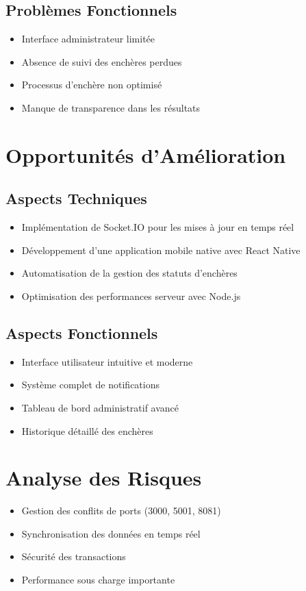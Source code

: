 \subsection{Problèmes Fonctionnels}
\begin{itemize}
    \item Interface administrateur limitée
    \item Absence de suivi des enchères perdues
    \item Processus d'enchère non optimisé
    \item Manque de transparence dans les résultats
\end{itemize}

\section{Opportunités d'Amélioration}
\subsection{Aspects Techniques}
\begin{itemize}
    \item Implémentation de Socket.IO pour les mises à jour en temps réel
    \item Développement d'une application mobile native avec React Native
    \item Automatisation de la gestion des statuts d'enchères
    \item Optimisation des performances serveur avec Node.js
\end{itemize}

\subsection{Aspects Fonctionnels}
\begin{itemize}
    \item Interface utilisateur intuitive et moderne
    \item Système complet de notifications
    \item Tableau de bord administratif avancé
    \item Historique détaillé des enchères
\end{itemize}

\section{Analyse des Risques}
\begin{itemize}
    \item Gestion des conflits de ports (3000, 5001, 8081)
    \item Synchronisation des données en temps réel
    \item Sécurité des transactions
    \item Performance sous charge importante
\end{itemize} 